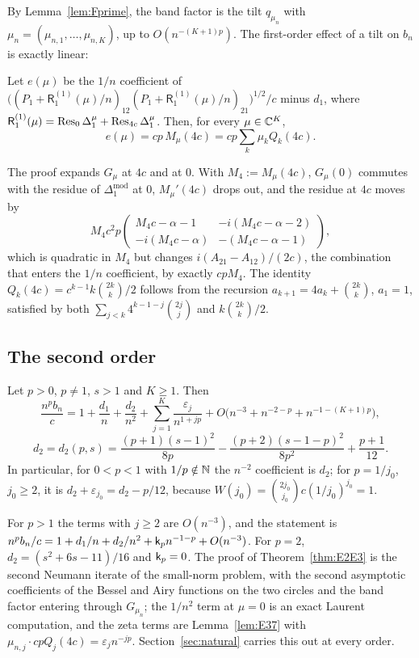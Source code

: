 By Lemma~\ref{lem:Fprime}, the band factor is the tilt $q_{\mu_n}$ with $\mu_n=(\mu_{n,1},\dots,\mu_{n,K})$, up to
$O(n^{-(K+1)p})$. The first-order effect of a tilt on $b_n$ is exactly linear:

\begin{lemma}\label{lem:E37}
Let $e(\mu)$ be the $1/n$ coefficient of $\bigl((P_1+\mathsf R_1^{(1)}(\mu)/n)_{12}(P_1+\mathsf R_1^{(1)}(\mu)/n)_{21}\bigr)^{1/2}/c$
minus $d_1$, where $\mathsf R_1^{(1)}(\mu)=\operatorname{Res}_0\Delta_1^\mu+\operatorname{Res}_{4c}\Delta_1^\mu$. Then, for every $\mu\in\mathbb{C}^K$,
\[
  e(\mu)=cp\,M_\mu(4c)=cp\sum_k\mu_kQ_k(4c).
\]
\end{lemma}

The proof expands $G_\mu$ at $4c$ and at $0$. With $M_4:=M_\mu(4c)$, $G_\mu(0)$ commutes with the residue of
$\Delta_1^{\mathrm{mod}}$ at $0$, $M_\mu'(4c)$ drops out, and the residue at $4c$ moves by
\[
  M_4c^2p\begin{pmatrix}M_4c-\alpha-1&-i(M_4c-\alpha-2)\\-i(M_4c-\alpha)&-(M_4c-\alpha-1)\end{pmatrix},
\]
which is quadratic in $M_4$ but changes $i(A_{21}-A_{12})/(2c)$, the combination that enters the $1/n$ coefficient, by
exactly $cpM_4$. The identity $Q_k(4c)=c^{k-1}k\binom{2k}k/2$ follows from the recursion
$a_{k+1}=4a_k+\binom{2k}k$, $a_1=1$, satisfied by both $\sum_{j<k}4^{k-1-j}\binom{2j}j$ and $k\binom{2k}k/2$.

\subsection{The second order}\label{sec:E2E3}
\begin{theorem}\label{thm:E2E3}
Let $p>0$, $p\ne1$, $s>1$ and $K\ge1$. Then
\[
  \frac{n^pb_n}c=1+\frac{d_1}n+\frac{d_2}{n^2}+\sum_{j=1}^K\frac{\varepsilon_j}{n^{1+jp}}
  +O\bigl(n^{-3}+n^{-2-p}+n^{-1-(K+1)p}\bigr),
\]
\[
  d_2=d_2(p,s)=\frac{(p+1)(s-1)^2}{8p}-\frac{(p+2)(s-1-p)^2}{8p^2}+\frac{p+1}{12}.
\]
In particular, for $0<p<1$ with $1/p\notin\mathbb{N}$ the $n^{-2}$ coefficient is $d_2$; for $p=1/j_0$, $j_0\ge2$, it is
$d_2+\varepsilon_{j_0}=d_2-p/12$, because $W(j_0)=\binom{2j_0}{j_0}c(1/j_0)^{j_0}=1$.
\end{theorem}

For $p>1$ the terms with $j\ge2$ are $O(n^{-3})$, and the statement is $n^pb_n/c=1+d_1/n+d_2/n^2+\mathsf k_p n^{-1-p}+O(n^{-3})$. For
$p=2$, $d_2=(s^2+6s-11)/16$ and $\mathsf k_p=0$. The proof of Theorem~\ref{thm:E2E3} is the second Neumann iterate of the small-norm
problem, with the second asymptotic coefficients of the Bessel and Airy functions on the two circles and the band
factor entering through $G_{\mu_n}$; the $1/n^2$ term at $\mu=0$ is an exact Laurent computation, and the zeta terms are
Lemma~\ref{lem:E37} with $\mu_{n,j}\cdot cpQ_j(4c)=\varepsilon_jn^{-jp}$. Section~\ref{sec:natural} carries this out at
every order.
